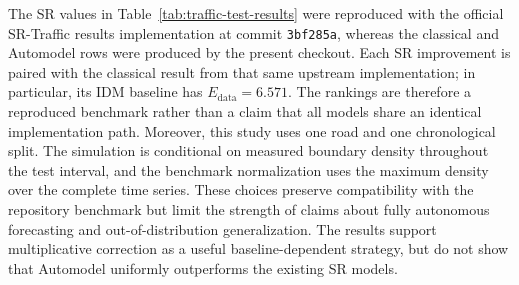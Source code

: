 The SR values in Table~\ref{tab:traffic-test-results} were reproduced with the
official SR-Traffic results implementation at commit \texttt{3bf285a}, whereas
the classical and Automodel rows were produced by the present checkout. Each SR
improvement is paired with the classical result from that same upstream
implementation; in particular, its IDM baseline has
$E_{\mathrm{data}}=6.571$. The rankings are therefore a reproduced benchmark
rather than a claim that all models share an identical implementation path.
Moreover, this study uses one road and one chronological split. The simulation
is conditional on measured boundary density throughout the test interval, and
the benchmark normalization uses the maximum density over the complete time
series. These choices preserve compatibility with the repository benchmark but
limit the strength of claims about fully autonomous forecasting and
out-of-distribution generalization. The results support multiplicative
correction as a useful baseline-dependent strategy, but do not show that
Automodel uniformly outperforms the existing SR models.
